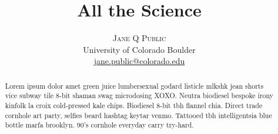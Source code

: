 \documentclass[twoside]{article}
\title{\vspace{-15mm}\fontsize{24pt}{10pt}\selectfont\textbf{All the Science}} %
\author{
\large
\textsc{Jane Q Public} \\%
\normalsize University of Colorado Boulder \\ %
\normalsize \href{mailto:jane.public@colorado.edu}{jane.public@colorado.edu} %
\vspace{-5mm}
}
\date{}
\begin{document}
\maketitle %

\thispagestyle{fancy} %


\begin{abstract}

\noindent Lorem ipsum dolor amet green juice lumbersexual godard listicle mlkshk jean shorts vice subway tile 8-bit shaman swag microdosing XOXO. Neutra biodiesel bespoke irony kinfolk la croix cold-pressed kale chips. Biodiesel 8-bit tbh flannel chia. Direct trade cornhole art party, selfies beard hashtag keytar venmo. Tattooed tbh intelligentsia blue bottle marfa brooklyn. 90's cornhole everyday carry try-hard.

\end{abstract}

\end{document}
